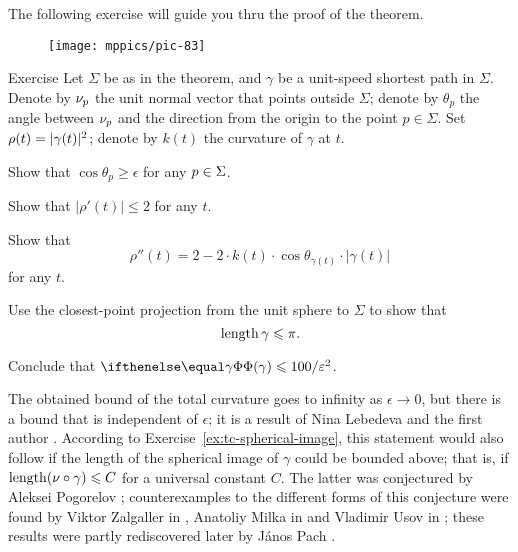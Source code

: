 The following exercise will guide you thru the proof of the theorem. 

\begin{wrapfigure}{r}{48 mm}
\vskip-0mm
\centering
\texttt{[image: mppics/pic-83]}
\vskip-0mm
\end{wrapfigure}

\begin{thm}{Exercise}\label{ex:bound-tc}
Let $\Sigma$ be as in the theorem, and $\gamma$ be a unit-speed shortest path in $\Sigma$.
Denote by $\nu_p$ the unit normal vector that points outside $\Sigma$;
denote by $\theta_p$ the angle between $\nu_p$ and the direction from the origin to the point $p\in\Sigma$.
Set $\rho(t)\z=|\gamma(t)|^2$; denote by $k(t)$ the curvature of $\gamma$ at $t$.

\begin{subthm}{}
Show that $\cos\theta_p\ge \epsilon$ for any $p\z\in \Sigma$.
\end{subthm}

\begin{subthm}{}
 Show that $|\rho'(t)|\le 2$ for any $t$.
\end{subthm}

\begin{subthm}{}
 Show that 
\[\rho''(t)=2-2\cdot k(t)\cdot \cos \theta_{\gamma(t)}\cdot |\gamma(t)|\]
for any $t$.
\end{subthm}

\begin{subthm}{}
 Use the closest-point projection from the unit sphere to $\Sigma$ to show that 
\[\mathop{\rm length}\nolimits \gamma\leqslant \pi.\]
\end{subthm}

\begin{subthm}{}
Conclude that $\tc\gamma\le 100/\epsilon^2$.
\end{subthm}

\end{thm}

The obtained bound of the total curvature goes to infinity as $\epsilon\to 0$,
but there is a bound that is independent of $\epsilon$;
it is a result of Nina Lebedeva and the first author \cite{lebedeva-petrunin}.
According to Exercise~\ref{ex:tc-spherical-image}, this statement would also follow if the length of the spherical image of $\gamma$ could be bounded above; 
that is, if $\mathop{\rm length}\nolimits(\nu\circ\gamma)\leqslant C$ for a universal constant $C$.
The latter was conjectured by Aleksei Pogorelov \cite{pogorelov};
counterexamples to the different forms of this conjecture were found 
by Viktor Zalgaller in \cite{zalgaller},
Anatoliy Milka in \cite{milka}
and Vladimir Usov in \cite{usov};
these results were partly rediscovered later 
by J\'{a}nos Pach \cite{pach}.
